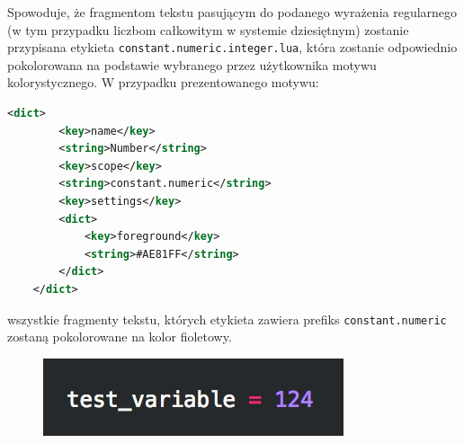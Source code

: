 Spowoduje, że fragmentom tekstu pasującym do podanego wyrażenia regularnego (w tym przypadku liczbom całkowitym w systemie dziesiętnym) zostanie przypisana etykieta \texttt{constant.numeric.integer.lua}, która zostanie odpowiednio pokolorowana na podstawie wybranego przez użytkownika motywu kolorystycznego. W przypadku prezentowanego motywu:

\begin{lstlisting}[language=XML, morekeywords={dict,key,string}]
    <dict>
        <key>name</key>
        <string>Number</string>
        <key>scope</key>
        <string>constant.numeric</string>
        <key>settings</key>
        <dict>
            <key>foreground</key>
            <string>#AE81FF</string>
        </dict>
    </dict>
\end{lstlisting}

wszystkie fragmenty tekstu, których etykieta zawiera prefiks \texttt{constant.numeric} zostaną pokolorowane na kolor fioletowy.

\begin{figure}[H]
\centering
\includegraphics{Chapters/kolorowanie_skladni}
\end{figure}
